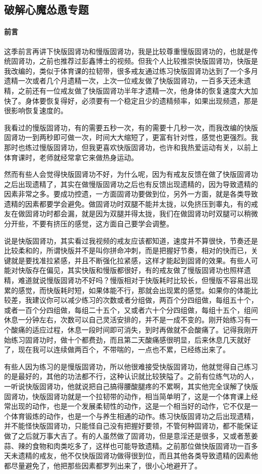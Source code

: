 \subsection{破解心魔怂恿专题}

\paragraph*{前言}

这季前言再讲下快版固肾功和慢版固肾功，我是比较尊重慢版固肾功的，也就是传统固肾功，之前也推荐过彭鑫博士的视频。但我个人比较推崇快版固肾功，快版是我改编的，类似于体育课的拉韧带，很多戒友通过练习快版固肾功达到了一个多月遗精一次或者几个月遗精一次，上次一位戒友做了快版固肾功，一百多天还未遗精，之前还有一位戒友做了快版固肾功半年才遗精一次，他身体的恢复速度大大加快了。身体要恢复得好，必须要有一个稳定且少的遗精频率，如果出现频遗，那是很影响恢复速度的。

我看过的慢版固肾功，有的需要五秒一次，有的需要十几秒一次，而我改编的快版固肾功一到两秒即可做一次，时间大大缩短了，更富有针对性，感觉也更强烈。我那时也练过慢版固肾功，但我更喜欢快版固肾功，也许和我热爱运动有关，以前上体育课时，老师就经常拿它来做热身运动。

然而有些人会觉得快版固肾功不好，为什么呢，因为有戒友反馈在做了快版固肾功之后出现遗精了，其实在做慢版固肾功之后也有反馈出现遗精的，因为导致遗精的因素非常之多。要成功控遗，一方面固肾功要做到位，另外一方面，就是各类导致遗精的因素都要学会避免。做固肾功时双腿不能并太拢，以免挤压到睾丸，有的戒友在做固肾功时都会漏，就是因为双腿并得太拢，我们在做固肾功时双腿可以稍微分开些，不要有挤压的感觉，这方面自己要学会调整。

说是快版固肾功，其实看过我视频的戒友应该都知道，速度并不算很快，节奏还是比较柔和的，所谓快版并不是叫你拼命冲刺，而是把握好节奏，相对的快而已，关键就是要找准拉紧感，并且不断强化拉紧感，这样才能起到固肾的效果。有些人可能对快版存在偏见，其实快版和慢版都很好，有的戒友做了慢版固肾功也照样遗精，难道就说慢版固肾功不好吗？慢版相对于快版耗时比较长，但慢版不容易出现累的感觉，而快版耗时短，如果体能不行，那就会出现累的感觉。如果你的体能比较差，我建议你可以减少练习的次数或者分组做，两百个分四组做，每组五十个，或者一百个分四组做，每组二十五个，又或者六十个分四组做，每组十五个，组间休息一分钟左右，次数可以自己灵活安排的，并不是一成不变的。刚开始练习有一个酸痛的适应过程，休息一段时间即可消失，到时再做就不会酸痛了。记得我刚开始练习固肾功时，做十个都费劲，而且第二天酸痛感很明显，后来休息几天就好了，现在我可以连续做两百个，不带喘的，一点也不累，已经练出来了。

有些人因为练习的是慢版固肾功，所以他很难接受快版固肾功，他就觉得自己练习的是最好的，其他的功法都不行，这种认识就比较狭隘了。之前有位练气功的人，一听说快版固肾功，他就说把自己搞得腰酸腿疼的不累啊，其实他完全误解了快版固肾功，快版固肾功就是一个拉韧带的动作，相当简单明了，这是一个体育课上经常出现的动作，也是一个发展柔韧性的动作，这是一个相当好的动作，它不仅是一个体育锻炼的动作，也是一个与养生相通的动作。练习快版固肾功之后出现遗精，并不能怪快版固肾功，只能怪自己没有把握好要领，不管何种固肾功，都不能保证做了之后就万事大吉了。有的人虽然做了固肾功，但是意淫还是很多，又或者葱姜蒜、辣的食物和肉类吃多了，这样也可能导致遗精。之前那位做快版固肾功一百多天未遗精的戒友，他不仅快版固肾功做得很到位，而且其他各类导致遗精的因素他都尽量避免了，他把那些因素都罗列出来了，很小心地避开了。

